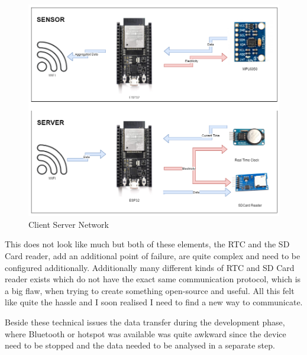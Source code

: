 \begin{figure}[h]
  \begin{center}
\includegraphics[width=\linewidth]{images/CommunicationDiagrammExplenation.png}
  \end{center}
  \caption{Client Server Network}
  \label{fig:ClientServer}
\end{figure}

This does not look like much but both of these elements, the RTC and the SD Card reader, add an additional point of failure, are quite complex and need to be configured additionally. Additionally many different kinds of RTC and SD Card reader exists which do not have the exact same communication protocol, which is a big flaw, when trying to create something open-source and useful. All this felt like quite the hassle and I soon realised I need to find a new way to communicate.

Beside these technical issues the data transfer during the development phase, where Bluetooth or hotspot was available was quite awkward since the device need to be stopped and the data needed to be analysed in a separate step. 

